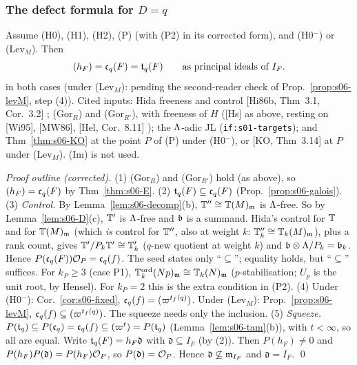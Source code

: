 \subsubsection{The defect formula for $D=q$}
\begin{theorem}\label{thm:s06-defect}
Assume (H0), (H1), (H2), (P) (with (P2) in its corrected form), and (H0$^-$) or (Lev$_M$). Then
\[(h_F)=\mathfrak{c}_q(F)=\mathfrak{t}_q(F)\qquad\text{as principal ideals of }I_F.\]
\stpmc{} in both cases (under (Lev$_M$): pending the second-reader check of Prop.~\ref{prop:s06-levM}, step (4)).
 Cited inputs: Hida freeness and control [Hi86b, Thm~3.1, Cor.~3.2]
; (Gor$_R$) and
(Gor$_{R'}$), with freeness of $H$ ([Hs] as above, resting on [Wi95], [MW86], [Hel, Cor.~8.11]
); the $\Lambda$-adic JL
(\texttt{if:s01-targets}); and Thm~\ref{thm:s06-KO} at the point $P$ of (P) under (H0$^-$), or [KO, Thm~3.14] at $P$ under
(Lev$_M$). (Im) is not used.
\end{theorem}
\noindent\emph{Proof outline (corrected).}
(1) (Gor$_R$) and (Gor$_{R'}$) hold (as above), so $(h_F)=\mathfrak{c}_q(F)$ by Thm~\ref{thm:s06-E}.
(2) $\mathfrak{t}_q(F)\subseteq\mathfrak{c}_q(F)$ (Prop.~\ref{prop:s06-galois}).
(3) \emph{Control.} By Lemma~\ref{lem:s06-decomp}(b), $\mathbb{T}''\cong\mathbb{T}(M)_{\mathfrak{m}}$ is $\Lambda$-free. So by Lemma~\ref{lem:s06-D}(c), $\mathbb{T}'$ is
$\Lambda$-free and $\mathfrak{b}$ is a summand. Hida's control for $\mathbb{T}$ and for $\mathbb{T}(M)_{\mathfrak{m}}$ (which \emph{is} control for $\mathbb{T}''$, also at weight
$k$: $\mathbb{T}''_k\cong\mathbb{T}_k(M)_{\mathfrak{m}}$), plus a rank count, gives
$\mathbb{T}'/P_k\mathbb{T}'\cong\mathbb{T}'_k$ ($q$-new quotient at weight $k$) and $\mathfrak{b}\otimes\Lambda/P_k=\mathfrak{b}_k$. Hence
$P(\mathfrak{c}_q(F))\mathcal{O}_P=\mathfrak{c}_q(f)$. The seed states only ``$\subseteq$''; equality holds, but ``$\subseteq$'' suffices. For $k_P\ge3$
(case P1), $\mathbb{T}^{\mathrm{ord}}_k(Np)_{\mathfrak{m}}\cong\mathbb{T}_k(N)_{\mathfrak{m}}$ ($p$-stabilisation; $U_p$ is the unit root, by Hensel). For $k_P=2$ this is the
extra condition in (P2).
(4) Under (H0$^-$): Cor.~\ref{cor:s06-fixed}, $\mathfrak{c}_q(f)=(\varpi^{t_f(q)})$. Under (Lev$_M$): Prop.~\ref{prop:s06-levM},
$\mathfrak{c}_q(f)\subseteq(\varpi^{t_f(q)})$. The squeeze needs only the inclusion.
(5) \emph{Squeeze.} $P(\mathfrak{t}_q)\subseteq P(\mathfrak{c}_q)=\mathfrak{c}_q(f)\subseteq(\varpi^t)=P(\mathfrak{t}_q)$ (Lemma~\ref{lem:s06-tam}(b)), with $t<\infty$,
so all are equal.  Write
$\mathfrak{t}_q(F)=h_F\mathfrak d$ with $\mathfrak d\subseteq I_F$ (by (2)). Then $P(h_F)\ne0$ and $P(h_F)P(\mathfrak d)=P(h_F)\mathcal{O}_P$, so
$P(\mathfrak d)=\mathcal{O}_P$. Hence $\mathfrak d\not\subseteq\mathfrak{m}_{I_F}$ and $\mathfrak d=I_F$. \qed

